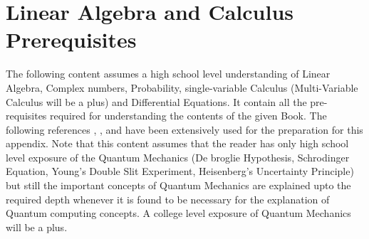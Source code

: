 \chapter{Linear Algebra and Calculus Prerequisites}
The following content assumes a high school level understanding of Linear Algebra, Complex numbers, Probability, single-variable Calculus 
(Multi-Variable Calculus will be a plus) and
Differential Equations. 
It contain all the pre-requisites required for understanding the contents of the given 
Book. The following references \cite{nielsen2001quantum}, \cite{dewolf2023quantum}, \cite{shankar2012principles}
and \cite{lin2022lecture} have been extensively used for the preparation for this appendix. 
Note that this content assumes that the reader has only high school level 
exposure of the Quantum Mechanics (De broglie Hypothesis, Schrodinger Equation, Young's Double Slit Experiment, Heisenberg's Uncertainty Principle) but still the important concepts of Quantum Mechanics are explained 
upto the required depth whenever it
is found to be necessary for the explanation of Quantum computing concepts. A college level
exposure of Quantum Mechanics will be a plus.

